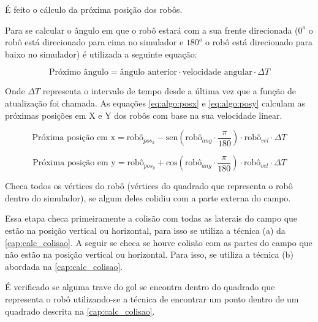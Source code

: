 \begin{alineas}[leftmargin=0pt, itemindent=20pt, labelwidth=15pt, labelsep=5pt, listparindent=1.25cm, align=left]

\item É feito o cálculo da próxima posição dos robôs.

Para se calcular o ângulo em que o robô estará com a sua frente direcionada ($0^o$ o robô está direcionado para cima no simulador e $180^o$ o robô está direcionado para baixo no simulador) é utilizada a seguinte equação:

\begin{equation}
    \label{eq:algo:angulo_robo}
    \text{Próximo ângulo} = \text{ângulo anterior} \cdot \text{velocidade angular} \cdot \Delta T
\end{equation}

Onde $\Delta T$ representa o intervalo de tempo desde a última vez que a função de atualização foi chamada. As equações \autoref{eq:algo:posx} e \autoref{eq:algo:posy} calculam as próximas posições em X e Y dos robôs com base na sua velocidade linear.

\begin{equation}
    \label{eq:algo:posx}
    \text{Próxima posição em x} = \text{robô}_{pos_x} - \text{sen}(\text{robô}_{ang} \cdot \frac{\pi}{180}) \cdot \text{robô}_{vel} \cdot \Delta T
\end{equation}

\begin{equation}
    \label{eq:algo:posy}
    \text{Próxima posição em y} = \text{robô}_{pos_y} + \text{cos}(\text{robô}_{ang} \cdot \frac{\pi}{180}) \cdot \text{robô}_{vel} \cdot \Delta T
\end{equation}

\item Checa todos os vértices do robô (vértices do quadrado que representa o robô dentro do simulador), se algum deles colidiu com a parte externa do campo.

Essa etapa checa primeiramente a colisão com todas as laterais do campo que estão na posição vertical ou horizontal, para isso se utiliza a técnica (a) da \autoref{cap:calc_colisao}. A seguir se checa se houve colisão com as partes do campo que não estão na posição vertical ou horizontal. Para isso, se utiliza a técnica (b) abordada na \autoref{cap:calc_colisao}.

\item É verificado se alguma trave do gol se encontra dentro do quadrado que representa o robô utilizando-se a técnica de encontrar um ponto dentro de um quadrado descrita na \autoref{cap:calc_colisao}.


\end{alineas}

